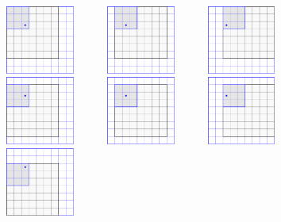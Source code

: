 \begin{primer}

\begin{figure}[htbp]
  \centering
  \includegraphics[width=0.2\textwidth]{./slike-latex/filterMSI1}\ \ \ \ \ \ 
  \includegraphics[width=0.2\textwidth]{./slike-latex/filterMSI2}\ \ \ \ \ \ 
  \includegraphics[width=0.2\textwidth]{./slike-latex/filterMSI3}\\[0.6cm]
  \includegraphics[width=0.2\textwidth]{./slike-latex/filterMSI4}\ \ \ \ \ \ 
  \includegraphics[width=0.2\textwidth]{./slike-latex/filterMSI5}\ \ \ \ \ \ 
  \includegraphics[width=0.2\textwidth]{./slike-latex/filterMSI6}\\[0.6cm]
  \includegraphics[width=0.2\textwidth]{./slike-latex/filterMSI7}\ \ \ \ \ \ 

\end{figure}
\end{primer}
